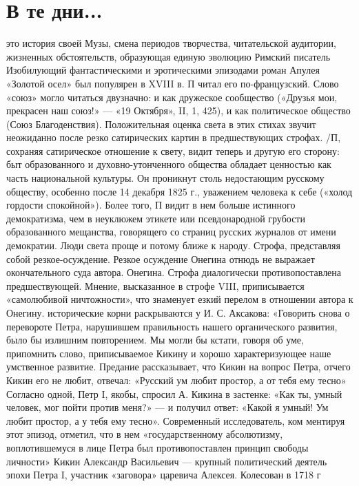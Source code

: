 \section{В те дни...}
\label{sec:musa}
это история своей Музы, смена периодов творчества, читательской аудитории, жизненных 
обстоятельств, образующая единую эволюцию
\label{apuleia}
Римский писатель Изобилующий фантастическими и эротическими эпизодами роман Апулея 
«Золотой осел» был популярен в XVIII в. П читал его по-французский.
\label{soiuz}
Слово «союз» могло читаться двузначно: и как дружеское сообщество
(«Друзья мои, прекрасен наш союз!» — «19 Октября», II, 1, 425), и как политическое общество
(Союз Благоденствия). 
\label{societa}
Положительная оценка света в этих стихах звучит неожиданно после резко сатирических 
картин в предшествующих строфах. /П, сохраняя сатирическое отношение к свету, видит теперь и другую его сторону: быт 
образованного и духовно-утонченного общества обладает ценностью как часть национальной культуры. 
Он проникнут столь недостающим русскому обществу, особенно после 14 декабря 1825 г., уважением человека к себе 
(«холод гордости спокойной»). Более того, П видит в нем больше истинного демократизма, чем в неуклюжем этикете или псевдонародной грубости образованного мещанства, говорящего со страниц русских журналов от имени демократии. Люди света проще и потому ближе 
к народу.
\label{oneghin}
Строфа, представляя собой резкое-осуждение. Резкое осуждение Онегина отнюдь не выражает 
окончательного суда автора.
Онегина.
\label{giudizio}
Строфа диалогически противопоставлена предшествующей. Мнение, высказанное в строфе VIII, приписывается «самолюбивой ничтожности», что знаменует езкий перелом в отношении автора к Онегину.
\label{intelligenza}
исторические корни раскрываются у И. С. Аксакова: «Говорить снова о перевороте Петра, 
нарушившем правильность нашего органического развития, было бы излишним повторением. 
Мы могли бы кстати, говоря об уме, припомнить слово, приписываемое Кикину и хорошо 
характеризующее наше умственное развитие. Предание рассказывает, что Кикин на вопрос Петра, отчего Кикин 
его не любит, отвечал: «Русский ум любит простор, а от тебя ему тесно»
Согласно одной, Петр I, якобы, спросил А. Кикина в застенке: 
«Как ты, умный человек, мог пойти против меня?» — 
и получил ответ: «Какой я умный! Ум любит простор, а у тебя ему тесно». Современный исследователь, ком
 ментируя этот эпизод, отметил, что в нем «государственному абсолютизму, воплотившемуся в лице Петра был  противопоставлен принцип свободы личности»  
 Кикин Александр Васильевич — крупный политический деятель эпохи Петра I, участник «заговора» царевича Алексея. Колесован в 1718 г
